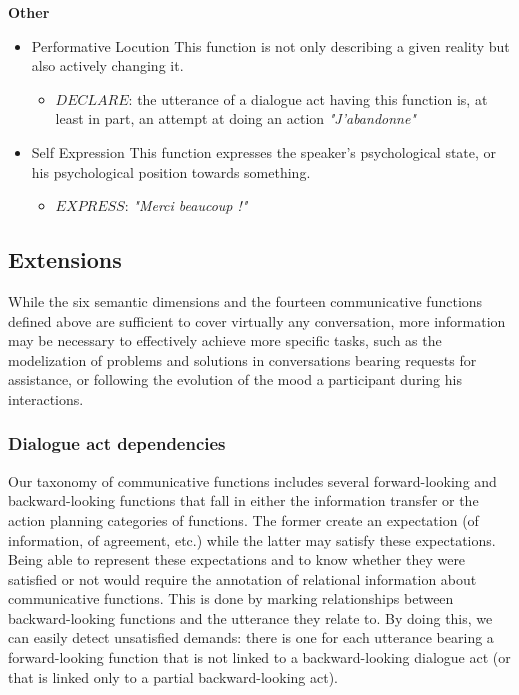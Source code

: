 \textbf{Other}
\vspace{0.1cm}

\begin{itemize}
	\item Performative Locution
		\newline This function is not only describing a given reality but also actively changing it.
		\begin{itemize}
			\item $DECLARE$: the utterance of a dialogue act having this function is, at least in part, an attempt at doing an action
			\newline \textit{"J'abandonne"}
		\end{itemize}
	\item Self Expression
		\newline This function expresses the speaker's psychological state, or his psychological position towards something.
		\begin{itemize}
			\item $EXPRESS$: 
			\newline \textit{"Merci beaucoup !"}
		\end{itemize}
\end{itemize}

\subsection{Extensions}

While the six semantic dimensions and the fourteen communicative functions defined above are sufficient to cover virtually any conversation, more information may be necessary to effectively achieve more specific tasks, such as the modelization of problems and solutions in conversations bearing requests for assistance, or following the evolution of the mood a participant during his interactions.

\subsubsection{Dialogue act dependencies}

Our taxonomy of communicative functions includes several forward-looking and backward-looking functions that fall in either the information transfer or the action planning categories of functions. The former create an expectation (of information, of agreement, etc.) while the latter may satisfy these expectations. Being able to represent these expectations and to know whether they were satisfied or not would require the annotation of relational information about communicative functions. This is done by marking relationships between backward-looking functions and the utterance they relate to. By doing this, we can easily detect unsatisfied demands: there is one for each utterance bearing a forward-looking function that is not linked to a backward-looking dialogue act (or that is linked only to a partial backward-looking act).


